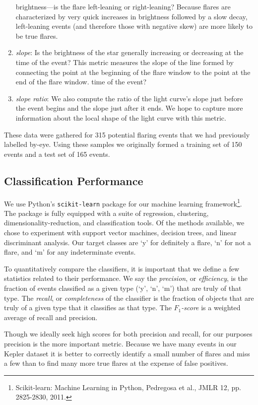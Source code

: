 \documentclass[11pt]{article}
\begin{document}
\begin{enumerate}[(1)]
  brightness---is the flare left-leaning or right-leaning?  Because
  flares are characterized by very quick increases in brightness
  followed by a slow decay, left-leaning events (and therefore those
  with negative skew) are more likely to be true flares.
\item \emph{slope}: Is the brightness of the star generally increasing
  or decreasing at the time of the event?  This metric measures the
  slope of the line formed by connecting the point at the beginning of
  the flare window to the point at the end of the flare window.
  time of the event?
\item \emph{slope ratio}: We also compute the ratio of the light
  curve's slope just before the event begins and the slope just after
  it ends.  We hope to capture more information about the local shape
  of the light curve with this metric.
\end{enumerate}
These data were gathered for 315 potential flaring events that we had
previously labelled by-eye.  Using these samples we originally formed
a training set of 150 events and a test set of 165 events.

\subsection{Classification Performance}
\label{sec:class}
We use Python's \verb|scikit-learn| package for our machine learning
framework\footnote{Scikit-learn: Machine Learning in Python, Pedregosa
  et al., JMLR 12, pp. 2825-2830, 2011.}.  The package is fully
equipped with a suite of regression, clustering,
dimensionality-reduction, and classification tools.  Of the methods
available, we chose to experiment with support vector machines,
decision trees, and linear discriminant analysis.  Our target classes
are `y' for definitely a flare, `n' for not a flare, and `m' for any
indeterminate events.

To quantitatively compare the classifiers, it is important that we
define a few statistics related to their performance.  We say the
\emph{precision}, or \emph{efficiency}, is the fraction of events
classified as a given type (`y', `n', `m') that are truly of that
type.  The \emph{recall}, or \emph{completeness} of the classifier is
the fraction of objects that are truly of a given type that it
classifies as that type.  The $F_1$\emph{-score} is a weighted average of
recall and precision.

Though we ideally seek high scores for both precision and recall, for
our purposes precision is the more important metric.  Because we have
many events in our Kepler dataset it is better to correctly identify a
small number of flares and miss a few than to find many more true
flares at the expense of false positives.
\end{document}
